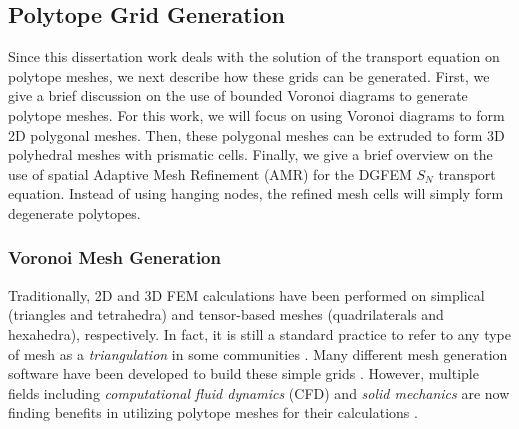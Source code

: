 \subsection{Polytope Grid Generation}
\label{sec::Intro_Past_Polytopes}

Since this dissertation work deals with the solution of the transport equation on polytope meshes, we next describe how these grids can be generated. First, we give a brief discussion on the use of bounded Voronoi diagrams to generate polytope meshes. For this work, we will focus on using Voronoi diagrams to form 2D polygonal meshes. Then, these polygonal meshes can be extruded to form 3D polyhedral meshes with prismatic cells. Finally, we give a brief overview on the use of spatial Adaptive Mesh Refinement (AMR) for the DGFEM $S_N$ transport equation. Instead of using hanging nodes, the refined mesh cells will simply form degenerate polytopes.

\subsubsection{Voronoi Mesh Generation}
\label{sec::Intro_Past_Polytopes_Voronoi}

Traditionally, 2D and 3D FEM calculations have been performed on simplical (triangles and tetrahedra) and tensor-based meshes (quadrilaterals and hexahedra), respectively. In fact, it is still a standard practice to refer to any type of mesh as a {\em triangulation} in some communities \cite{ern2013theory}. Many different mesh generation software have been developed to build these simple grids \cite{shewchuk1996triangle,shewchuk2002delaunay,si2015tetgen,geuzaine2009gmsh}. However, multiple fields including {\em computational fluid dynamics} (CFD) and {\em solid mechanics} are now finding benefits in utilizing polytope meshes for their calculations \cite{ref::star_CCM,yip2005automated}.


